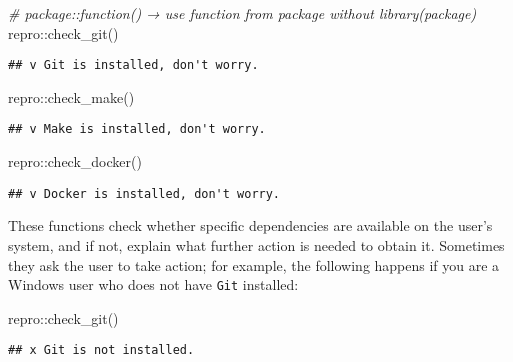 \documentclass[psych,tutorial,submit,moreauthors,pdftex]{mdpi}
\newenvironment{Shaded}{\begin{snugshade}}{\end{snugshade}}
\newcommand{\CommentTok}[1]{\textcolor[rgb]{0.56,0.35,0.01}{\textit{#1}}}
\newcommand{\FunctionTok}[1]{\textcolor[rgb]{0.00,0.00,0.00}{#1}}
\newcommand{\NormalTok}[1]{#1}
\newcommand{\SpecialCharTok}[1]{\textcolor[rgb]{0.00,0.00,0.00}{#1}}
\begin{document}
\begin{Shaded}
\begin{Highlighting}[]
\CommentTok{\# \textasciigrave{}package::function()\textasciigrave{} → use function from package without \textasciigrave{}library(package)\textasciigrave{}}
\NormalTok{repro}\SpecialCharTok{::}\FunctionTok{check\_git}\NormalTok{()}
\end{Highlighting}
\end{Shaded}

\begin{verbatim}
## v Git is installed, don't worry.
\end{verbatim}

\begin{Shaded}
\begin{Highlighting}[]
\NormalTok{repro}\SpecialCharTok{::}\FunctionTok{check\_make}\NormalTok{()}
\end{Highlighting}
\end{Shaded}

\begin{verbatim}
## v Make is installed, don't worry.
\end{verbatim}

\begin{Shaded}
\begin{Highlighting}[]
\NormalTok{repro}\SpecialCharTok{::}\FunctionTok{check\_docker}\NormalTok{()}
\end{Highlighting}
\end{Shaded}

\begin{verbatim}
## v Docker is installed, don't worry.
\end{verbatim}

These functions check whether specific dependencies are available on the
user's system, and if not, explain what further action is needed to
obtain it. Sometimes they ask the user to take action; for example, the
following happens if you are a Windows user who does not have
\texttt{Git} installed:

\begin{Shaded}
\begin{Highlighting}[]
\NormalTok{repro}\SpecialCharTok{::}\FunctionTok{check\_git}\NormalTok{()}
\end{Highlighting}
\end{Shaded}

\begin{verbatim}
## x Git is not installed.
\end{verbatim}
\end{document}
